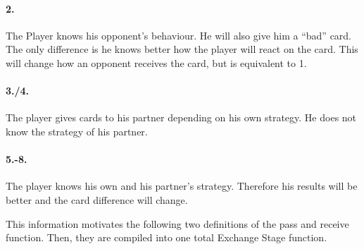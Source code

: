 \paragraph{2.}
The Player knows his opponent’s behaviour. He will also give him a “bad” card. The only difference is he knows better how the player will react on the card. This will change how an opponent receives the card, but is equivalent to 1. 
\paragraph{3./4.}
The player gives cards to his partner depending on his own strategy. He does not know the strategy of his partner.
\paragraph{5.-8.}
The player knows his own and his partner’s strategy. Therefore his results will be better and the card difference will change.

This information motivates the following two definitions of the pass and receive function. Then, they  are compiled into one total Exchange Stage function. 


